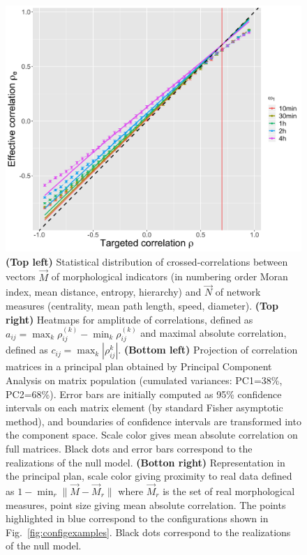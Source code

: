 \documentclass{bmcart}
\newcommand{\norm}[1]{\| #1 \|}
\begin{document}
\begin{figure}[h!]
\includegraphics[width=\linewidth]{figures/Fig2.png}
\caption{ \textbf{(Top left)} Statistical distribution of crossed-correlations between vectors $\vec{M}$ of morphological indicators (in numbering order Moran index, mean distance, entropy, hierarchy) and $\vec{N}$ of network measures (centrality, mean path length, speed, diameter). \textbf{(Top right)} Heatmaps for amplitude of correlations, defined as $a_{ij}=\max_k{\rho_{ij}^{(k)}}-\min_k{\rho_{ij}^{(k)}}$ and maximal absolute correlation, defined as $c_{ij}=\max_k\left| \rho_{ij}^{k} \right|$. \textbf{(Bottom left)} Projection of correlation matrices in a principal plan obtained by Principal Component Analysis on matrix population (cumulated variances: PC1=38\%, PC2=68\%). Error bars are initially computed as 95\% confidence intervals on each matrix element (by standard Fisher asymptotic method), and boundaries of confidence intervals are transformed into the component space. Scale color gives mean absolute correlation on full matrices. Black dots and error bars correspond to the realizations of the null model. \textbf{(Botton right)} Representation in the principal plan, scale color giving proximity to real data defined as $1 - \min_r \norm{\vec{M}-\vec{M}_r}$ where $\vec{M}_r$ is the set of real morphological measures, point size giving mean absolute correlation. The points highlighted in blue correspond to the configurations shown in Fig.~\ref{fig:configexamples}. Black dots correspond to the realizations of the null model.\label{fig:densnwcor}}
\end{figure}
\end{document}
